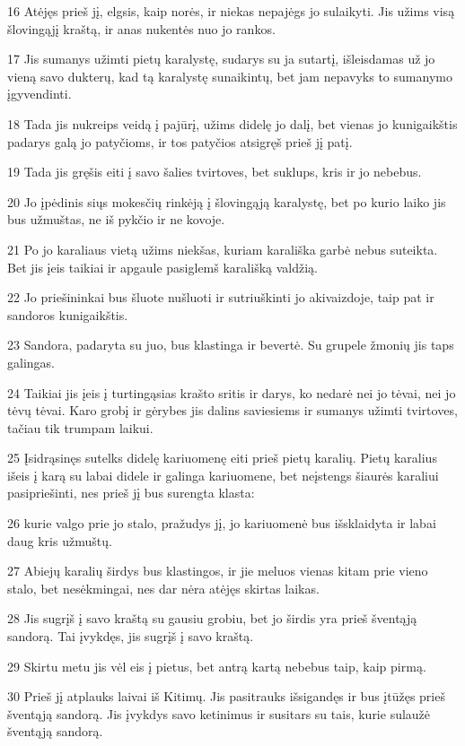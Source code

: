 \par 16 Atėjęs prieš jį, elgsis, kaip norės, ir niekas nepajėgs jo sulaikyti. Jis užims visą šlovingąjį kraštą, ir anas nukentės nuo jo rankos. 
\par 17 Jis sumanys užimti pietų karalystę, sudarys su ja sutartį, išleisdamas už jo vieną savo dukterų, kad tą karalystę sunaikintų, bet jam nepavyks to sumanymo įgyvendinti. 
\par 18 Tada jis nukreips veidą į pajūrį, užims didelę jo dalį, bet vienas jo kunigaikštis padarys galą jo patyčioms, ir tos patyčios atsigręš prieš jį patį. 
\par 19 Tada jis gręšis eiti į savo šalies tvirtoves, bet suklups, kris ir jo nebebus. 
\par 20 Jo įpėdinis siųs mokesčių rinkėją į šlovingąją karalystę, bet po kurio laiko jis bus užmuštas, ne iš pykčio ir ne kovoje. 
\par 21 Po jo karaliaus vietą užims niekšas, kuriam karališka garbė nebus suteikta. Bet jis įeis taikiai ir apgaule pasiglemš karališką valdžią. 
\par 22 Jo priešininkai bus šluote nušluoti ir sutriuškinti jo akivaizdoje, taip pat ir sandoros kunigaikštis. 
\par 23 Sandora, padaryta su juo, bus klastinga ir bevertė. Su grupele žmonių jis taps galingas. 
\par 24 Taikiai jis įeis į turtingąsias krašto sritis ir darys, ko nedarė nei jo tėvai, nei jo tėvų tėvai. Karo grobį ir gėrybes jis dalins saviesiems ir sumanys užimti tvirtoves, tačiau tik trumpam laikui. 
\par 25 Įsidrąsinęs sutelks didelę kariuomenę eiti prieš pietų karalių. Pietų karalius išeis į karą su labai didele ir galinga kariuomene, bet neįstengs šiaurės karaliui pasipriešinti, nes prieš jį bus surengta klasta: 
\par 26 kurie valgo prie jo stalo, pražudys jį, jo kariuomenė bus išsklaidyta ir labai daug kris užmuštų. 
\par 27 Abiejų karalių širdys bus klastingos, ir jie meluos vienas kitam prie vieno stalo, bet nesėkmingai, nes dar nėra atėjęs skirtas laikas. 
\par 28 Jis sugrįš į savo kraštą su gausiu grobiu, bet jo širdis yra prieš šventąją sandorą. Tai įvykdęs, jis sugrįš į savo kraštą. 
\par 29 Skirtu metu jis vėl eis į pietus, bet antrą kartą nebebus taip, kaip pirmą. 
\par 30 Prieš jį atplauks laivai iš Kitimų. Jis pasitrauks išsigandęs ir bus įtūžęs prieš šventąją sandorą. Jis įvykdys savo ketinimus ir susitars su tais, kurie sulaužė šventąją sandorą. 
